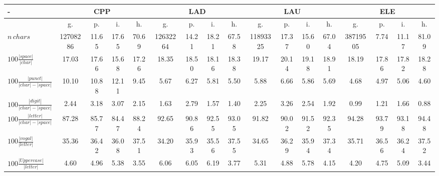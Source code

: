 \documentclass[%
 aip,
 jmp,%
 amsmath,amssymb,
 reprint,%
 floatfix,
]{revtex4-1}
\begin{document}
\renewcommand{\arraystretch}{2}
\begin{table}
  \centering
    \small
\setlength{\tabcolsep}{.056667em}
  \begin{tabular}{|l|| c|c|c|c||  c|c|c|c||   c|c|c|c||   c|c|c|c|}\hline
-\-  & \multicolumn{4}{c|}{CPP} & \multicolumn{4}{c|}{LAD} & \multicolumn{4}{c|}{LAU} & \multicolumn{4}{c|}{ELE} \\ \hline
 & g. & p. & i. & h. &     g. & p. & i. & h. &    g. & p. & i. & h. &    g. & p. & i. & h. \\\hline
$n\,chars$  & 12708286 & 11.65 & 17.65 & 70.69 & 12632264 & 14.21 & 18.21 & 67.58 & 11893325 & 17.37 & 15.60 & 67.04 & 38719505 & 7.74 & 11.17 & 81.09 \\\hline
$100\frac{|space|}{|char|}$  & 17.03 & 17.66 & 15.68 & 17.26 & 18.35 & 18.50 & 18.16 & 18.38 & 19.17 & 20.14 & 19.18 & 18.91 & 18.19 & 17.86 & 17.82 & 18.28 \\\hline
$100\frac{|punct|}{|char|-|space|}$  & 10.10 & 10.88 & 12.11 & 9.45 & 5.67 & 6.27 & 5.81 & 5.50 & 5.88 & 6.66 & 5.86 & 5.69 & 4.68 & 4.97 & 5.06 & 4.60 \\\hline
$100\frac{|digit|}{|char|-|space|}$  & 2.44 & 3.18 & 3.07 & 2.15 & 1.63 & 2.79 & 1.57 & 1.40 & 2.25 & 3.26 & 2.54 & 1.92 & 0.99 & 1.21 & 1.66 & 0.88 \\\hline
$100\frac{|letter|}{|char|-|space|}$  & 87.28 & 85.77 & 84.47 & 88.24 & 92.65 & 90.86 & 92.55 & 93.05 & 91.82 & 90.02 & 91.52 & 92.35 & 94.28 & 93.79 & 93.18 & 94.48 \\\hline
$100\frac{|vogal|}{|letter|}$  & 35.36 & 36.42 & 36.08 & 37.51 & 34.20 & 35.93 & 35.56 & 37.55 & 34.65 & 36.29 & 35.94 & 37.34 & 35.71 & 36.56 & 36.24 & 37.52 \\\hline
$100\frac{|Uppercase|}{|letter|}$  & 4.60 & 4.96 & 5.38 & 3.55 & 6.06 & 6.05 & 6.19 & 3.77 & 5.31 & 4.88 & 5.78 & 4.15 & 4.20 & 4.75 & 5.09 & 3.44 \\\hline

\end{tabular}
\end{table}
\end{document}
